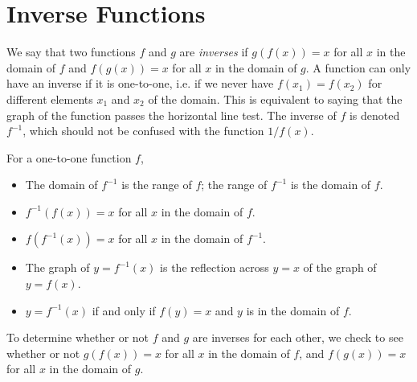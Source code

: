 \section{Inverse Functions}\label{sec:inv_funcs}

We say that two functions $f$ and $g$ are \emph{inverses} if $g(f(x))=x$ for all $x$ in the domain of $f$ and $f(g(x))=x$ for all $x$ in the domain of $g$. A function can only have an inverse if it is one-to-one, i.e. if we never have $f(x_1)=f(x_2)$ for different elements $x_1$ and $x_2$ of the domain. This is equivalent to saying that the graph of the function passes the horizontal line test.
%
The inverse of $f$ is denoted $f^{-1}$, which should not be confused with the function $1/f(x)$.

\begin{keyidea}\label{ki_inv_funcs}%
For a one-to-one function $f$,
\begin{itemize}
\item The domain of $f^{-1}$ is the range of $f$; the range of $f^{-1}$ is the domain of $f$.
\item $f^{-1}(f(x))=x$ for all $x$ in the domain of $f$.
\item $f(f^{-1}(x))=x$ for all $x$ in the domain of $f^{-1}$.
\item The graph of $y=f^{-1}(x)$ is the reflection across $y=x$ of the graph of $y=f(x)$.
\item $y=f^{-1}(x)$ if and only if $f(y)=x$ and $y$ is in the domain of $f$.
\end{itemize}
\end{keyidea}


To determine whether or not $f$ and $g$ are inverses for each other, we check to see whether or not $g(f(x))=x$ for all $x$ in the domain of $f$, and $f(g(x))=x$ for all $x$ in the domain of $g$.

